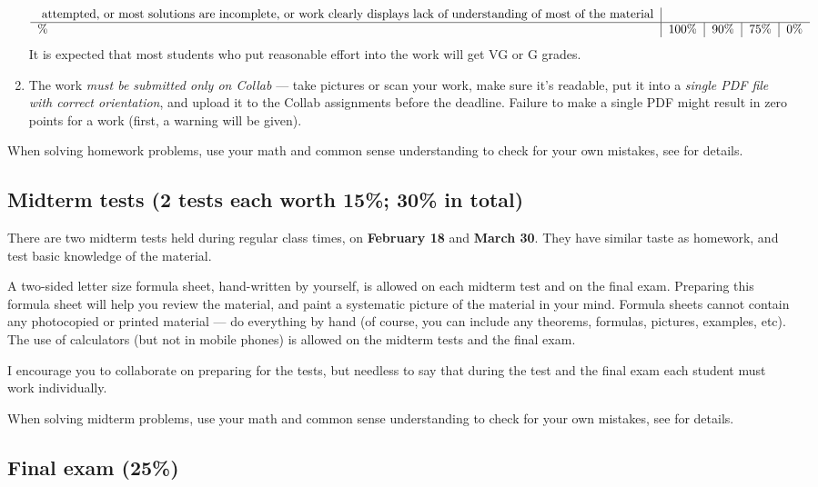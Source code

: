 \documentclass[oneside,11pt]{amsart}
\begin{document}
\begin{enumerate}[$\bullet$]
\begin{equation*}
\begin{tabular}{l|l|l|l|l}
{				attempted, or most solutions are incomplete, or work clearly displays lack of understanding of most of the material}\\
				\hline
				\%    & 100\%          & 90\%     & 75\% & 0\%
			\end{tabular}
		\end{equation*}
		It is expected that most students 
		who put reasonable effort into the work
		will get VG or G grades. 
	\item 
		The work \emph{must be submitted only on Collab} --- 
		take pictures or scan your work,
		make sure it's readable,
		put it into a \emph{single PDF file with correct orientation},
		and upload it to the Collab assignments before the deadline.
		Failure to make a single PDF might result in zero points for a work
		(first, a warning will be given).
\end{enumerate}

When solving homework problems, use your math and common sense understanding to check for your own mistakes,
see  for details.

\subsection{Midterm tests (2 tests each worth 15\%; 30\% in total)}

There are two midterm tests
held
during regular class times, on \textbf{February 18} and \textbf{March 30}.
They have
similar taste as homework, and test basic knowledge of the material.

A two-sided letter size formula sheet, hand-written by yourself, is
allowed on each midterm test and on the final exam. Preparing this formula sheet
will help you review the material, and paint a systematic picture of the material in your mind.
Formula sheets cannot contain any photocopied or printed material
--- do everything by hand (of course, you can include any theorems, formulas, pictures, 
examples, etc).
The use of calculators (but not in mobile phones)
is allowed on the midterm tests and the final exam.

I encourage you to collaborate on preparing for the tests, but needless to say that
during the test and the final exam each student must work individually.

When solving midterm problems, use your math and common sense understanding to check for your own mistakes,
see  for details.


\subsection{Final exam (25\%)}
\end{document}
